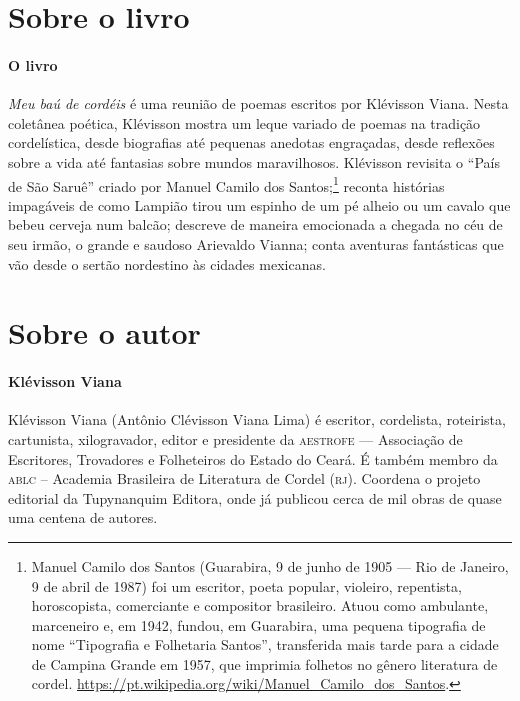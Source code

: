\documentclass[11pt]{extarticle}
\begin{document}
\section{Sobre o livro}

\paragraph{O livro} \textit{Meu baú de cordéis} é uma reunião de poemas escritos por Klévisson Viana. 
Nesta coletânea poética, Klévisson mostra um leque variado de poemas na 
tradição cordelística, desde biografias até pequenas anedotas engraçadas, desde 
reflexões sobre a vida até fantasias sobre mundos maravilhosos. Klévisson revisita 
o “País de São Saruê” criado por Manuel Camilo dos Santos;\footnote{
Manuel Camilo dos Santos (Guarabira, 9 de junho de 1905 — Rio de Janeiro, 9 de abril de 1987) foi um escritor, poeta popular, violeiro, repentista, horoscopista, comerciante e compositor brasileiro.
Atuou como ambulante, marceneiro e, em 1942, fundou, em Guarabira, uma pequena tipografia de nome ``Tipografia e Folhetaria Santos'', transferida mais tarde para a cidade de Campina Grande em 1957, que imprimia  folhetos no gênero literatura de cordel. \url{https://pt.wikipedia.org/wiki/Manuel_Camilo_dos_Santos}. }
reconta histórias impagáveis 
de como Lampião tirou um espinho de um pé alheio ou um cavalo que bebeu cerveja num 
balcão; descreve de maneira emocionada a chegada no céu de seu irmão, o grande e 
saudoso Arievaldo Vianna; conta aventuras fantásticas que vão desde o sertão nordestino 
às cidades mexicanas.

\section{Sobre o autor}

\paragraph{Klévisson Viana}

Klévisson Viana (Antônio Clévisson Viana Lima) é escritor, cordelista, roteirista, cartunista, xilogravador, editor e presidente da \textsc{aestrofe} --- Associação de Escritores, Trovadores e Folheteiros do Estado do Ceará. É também membro da \textsc{ablc} -- Academia Brasileira de Literatura de Cordel (\textsc{rj}). Coordena o projeto editorial da Tupynanquim Editora, onde já publicou cerca de mil obras de quase uma centena de autores. 
\end{document}
